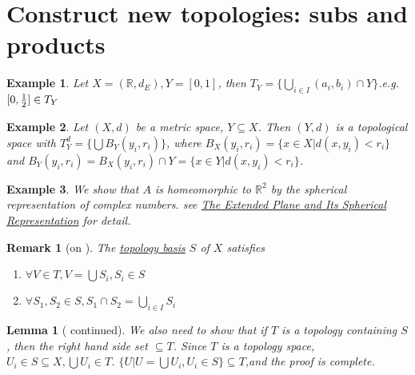\documentclass{article}
\newtheorem{example}{Example}[section] %
\newtheorem{lemma}{Lemma}[section]
\newtheorem{remark}{Remark}[section]
\begin{document}
\section{Construct new topologies: subs and products}
\setcounter{example}{-1}
\begin{example}
Let $X=(\mathbb{R},d_E),Y=[0,1]$, then $T_Y=\{\bigcup_{i\in I} (a_i,b_i)\cap Y\}$.e.g. $[0,{1\over 2}]\in T_Y$
\end{example}
\begin{example}
Let $(X,d)$ be a metric space, $Y\subseteq X$. Then $(Y,d)$ is a topological space with $T_Y^d = \{\bigcup B_Y(y_i,r_i)\}$, where $B_X(y_i,r_i)=\{x\in X|d(x,y_i)<r_i\}$ and $B_Y(y_i,r_i)=B_X(y_i,r_i)\cap Y = \{x\in Y|d(x,y_i)<r_i\}$.
\end{example}
\begin{example}
\normalfont
We show that $A$ is homeomorphic to $\mathbb{R}^2$ by the spherical representation of complex numbers. see \href{https://faculty.etsu.edu/gardnerr/5510/notes/I-6.pdf}{The Extended Plane and Its Spherical Representation} for detail.
\end{example}
\setcounter{remark}{2}
\begin{remark}[on ]
The \href{https://en.wikipedia.org/wiki/Base_(topology)}{topology basis} $S$ of $X$ satisfies
\begin{enumerate}
\item $\forall V\in T, V=\bigcup S_i, S_i\in S$
\item $\forall S_1,S_2 \in S, S_1\cap S_2 = \bigcup_{i\in I}S_i$
\end{enumerate}
\end{remark}
\setcounter{lemma}{3}
\begin{lemma}[ continued]
\normalfont
We also need to show that if $T$ is a topology containing $S$, then the right hand side set $\subseteq T$. Since $T$ is a topology space, $U_i\in S\subseteq X,\bigcup U_i\in T$. $\{U|U=\bigcup U_i,U_i\in S\}\subseteq T$,and the proof is complete.
\end{lemma}
\end{document}
